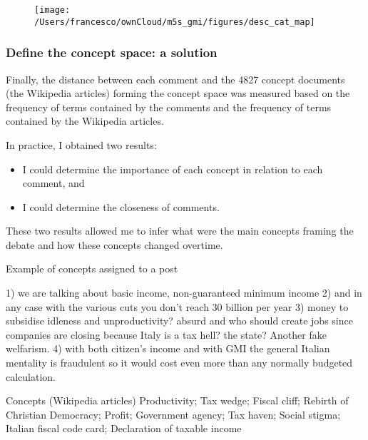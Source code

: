 \documentclass[serif, aspectratio=169]{beamer}
\begin{document}
\begin{frame}
\begin{figure}
    \texttt{[image: /Users/francesco/ownCloud/m5s\_gmi/figures/desc\_cat\_map]}
\end{figure}
\end{frame}

\begin{frame}
\frametitle{Define the concept space: a solution}

Finally, the distance between each comment and the 4827 concept documents (the Wikipedia articles) forming the concept space was measured based on the frequency of terms contained by the comments and the frequency of terms contained by the Wikipedia articles. 

In practice, I obtained two results:

\begin{itemize}

\item I could determine the importance of each concept in relation to each comment, and

\item I could determine the closeness of comments.

\end{itemize}

These two results allowed me to infer what were the main concepts framing the debate and how these concepts changed overtime.

\end{frame}


\begin{frame}
{Example of concepts assigned to a post}

\begin{exampleblock}{}
1) we are talking about basic income, non-guaranteed minimum income 2) and in any case with the various cuts you don't reach 30 billion per year 3) money to subsidise idleness and unproductivity? absurd and who should create jobs since companies are closing because Italy is a tax hell? the state? Another fake welfarism. 4) with both citizen's income and with GMI the general Italian mentality is fraudulent so it would cost even more than any normally budgeted calculation. 
\end{exampleblock}

\begin{exampleblock}{Concepts (Wikipedia articles)}
Productivity; Tax wedge; Fiscal cliff; Rebirth of Christian Democracy; Profit; Government agency; Tax haven; Social stigma; Italian fiscal code card; Declaration of taxable income
\end{exampleblock}

\end{frame}
\end{document}
